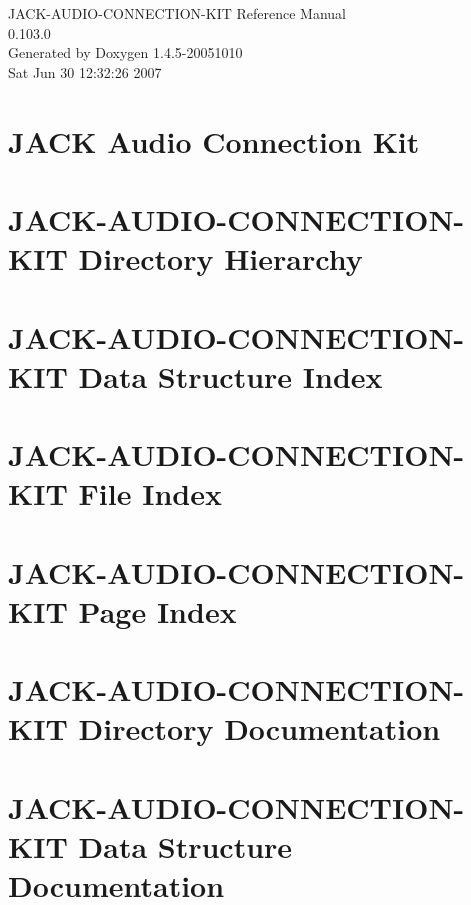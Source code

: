 \documentclass[letterpaper]{book}
\begin{document}
\begin{titlepage}
\vspace*{7cm}
\begin{center}
{\Large JACK-AUDIO-CONNECTION-KIT Reference Manual\\[1ex]\large 0.103.0 }\\
\vspace*{1cm}
{\large Generated by Doxygen 1.4.5-20051010}\\
\vspace*{0.5cm}
{\small Sat Jun 30 12:32:26 2007}\\
\end{center}
\end{titlepage}
\clearemptydoublepage
{}
\tableofcontents
\clearemptydoublepage
{}
\chapter{JACK Audio Connection Kit }
\label{index}\hypertarget{index}{}
\chapter{JACK-AUDIO-CONNECTION-KIT Directory Hierarchy}

\chapter{JACK-AUDIO-CONNECTION-KIT Data Structure Index}

\chapter{JACK-AUDIO-CONNECTION-KIT File Index}

\chapter{JACK-AUDIO-CONNECTION-KIT Page Index}

\chapter{JACK-AUDIO-CONNECTION-KIT Directory Documentation}


\chapter{JACK-AUDIO-CONNECTION-KIT Data Structure Documentation}






\end{document}
